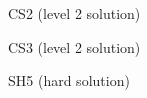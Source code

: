 \documentclass[10pt,letterpaper]{article}
\begin{document}
\noindent\begin{minipage}{0.47\linewidth}\begin{center}
CS2 (level 2 solution) \\
\end{center}\end{minipage}
\hfill
\begin{minipage}{0.47\linewidth}\begin{center}
CS3 (level 2 solution) \\
\end{center}\end{minipage}
\vspace*{12pt}

\begin{minipage}{0.47\linewidth}\begin{center}
SH5 (hard solution) \\
\end{center}\end{minipage}\hfill
\end{document}
